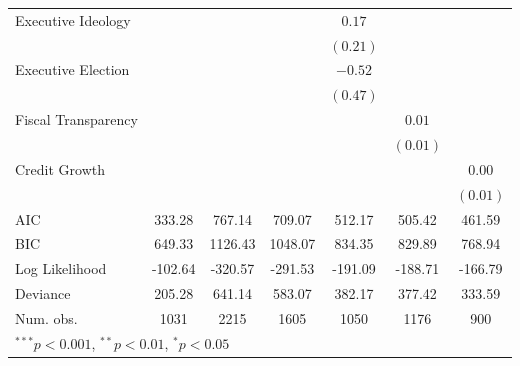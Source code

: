 \begin{tabular}{l c c c c c c }
Executive Ideology          &               &              &              & $0.17$      &               &            \\
                            &               &              &              & $(0.21)$    &               &            \\
Executive Election          &               &              &              & $-0.52$     &               &            \\
                            &               &              &              & $(0.47)$    &               &            \\
Fiscal Transparency         &               &              &              &             & $0.01$        &            \\
                            &               &              &              &             & $(0.01)$      &            \\
Credit Growth               &               &              &              &             &               & $0.00$     \\
                            &               &              &              &             &               & $(0.01)$   \\
\hline
AIC                         & 333.28        & 767.14       & 709.07       & 512.17      & 505.42        & 461.59     \\
BIC                         & 649.33        & 1126.43      & 1048.07      & 834.35      & 829.89        & 768.94     \\
Log Likelihood              & -102.64       & -320.57      & -291.53      & -191.09     & -188.71       & -166.79    \\
Deviance                    & 205.28        & 641.14       & 583.07       & 382.17      & 377.42        & 333.59     \\
Num. obs.                   & 1031          & 2215         & 1605         & 1050        & 1176          & 900        \\
\hline
\multicolumn{7}{l}{\scriptsize{$^{***}p<0.001$, $^{**}p<0.01$, $^*p<0.05$}}
\end{tabular}
